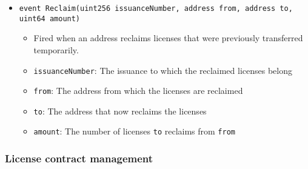 \documentclass[a4paper]{article}
\begin{document}
\begin{itemize}
  \item \texttt{event Reclaim(uint256 issuanceNumber, address from, address to, uint64 amount)}
  \begin{itemize}
    \item Fired when an address reclaims licenses that were previously transferred temporarily.
    \item \texttt{issuanceNumber}: The issuance to which the reclaimed licenses belong
    \item \texttt{from}: The address from which the licenses are reclaimed
    \item \texttt{to}: The address that now reclaims the licenses
    \item \texttt{amount}: The number of licenses \texttt{to} reclaims from \texttt{from}
  \end{itemize}
\end{itemize}

\subsubsection{License contract management}
\end{document}

